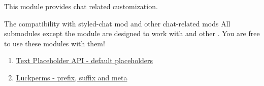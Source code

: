 This module provides chat related customization.

\begin{note}{The compatibility with styled-chat mod and other chat-related mods}
    All submodules except the  module are designed to work with  and other .
    You are free to use these modules with them!
\end{note}

\begin{enumerate}
    \item \href{https://placeholders.pb4.eu/user/default-placeholders/}{Text Placeholder API - default placeholders}
    \item \href{https://luckperms.net/wiki/Prefixes,-Suffixes-&-Meta}{Luckperms - prefix, suffix and meta}
\end{enumerate}


\clearpage


\clearpage


\clearpage


\clearpage


\clearpage


\clearpage


\clearpage


\clearpage


